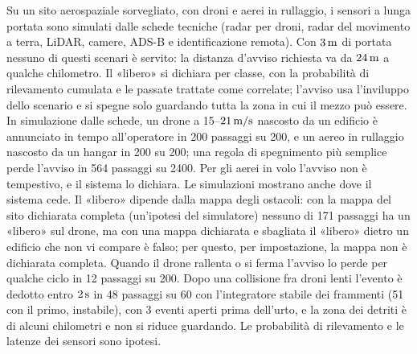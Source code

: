 Su un sito aerospaziale sorvegliato, con droni e aerei in rullaggio, i sensori a lunga portata sono simulati dalle schede tecniche (radar per droni, radar del movimento a terra, LiDAR, camere, ADS-B e identificazione remota). Con $3\,\mathrm{m}$ di portata nessuno di questi scenari è servito: la distanza d'avviso richiesta va da $24\,\mathrm{m}$ a qualche chilometro. Il «libero» si dichiara per classe, con la probabilità di rilevamento cumulata e le passate trattate come correlate; l'avviso usa l'inviluppo dello scenario e si spegne solo guardando tutta la zona in cui il mezzo può essere. In simulazione dalle schede, un drone a 15--$21\,\mathrm{m/s}$ nascosto da un edificio è annunciato in tempo all'operatore in 200 passaggi su 200, e un aereo in rullaggio nascosto da un hangar in 200 su 200; una regola di spegnimento più semplice perde l'avviso in 564 passaggi su 2400. Per gli aerei in volo l'avviso non è tempestivo, e il sistema lo dichiara.
Le simulazioni mostrano anche dove il sistema cede. Il «libero» dipende dalla mappa degli ostacoli: con la mappa del sito dichiarata completa (un'ipotesi del simulatore) nessuno di 171 passaggi ha un «libero» sul drone, ma con una mappa dichiarata e sbagliata il «libero» dietro un edificio che non vi compare è falso; per questo, per impostazione, la mappa non è dichiarata completa. Quando il drone rallenta o si ferma l'avviso lo perde per qualche ciclo in 12 passaggi su 200. Dopo una collisione fra droni lenti l'evento è dedotto entro $2\,\mathrm{s}$ in 48 passaggi su 60 con l'integratore stabile dei frammenti (51 con il primo, instabile), con 3 eventi aperti prima dell'urto, e la zona dei detriti è di alcuni chilometri e non si riduce guardando. Le probabilità di rilevamento e le latenze dei sensori sono ipotesi.
